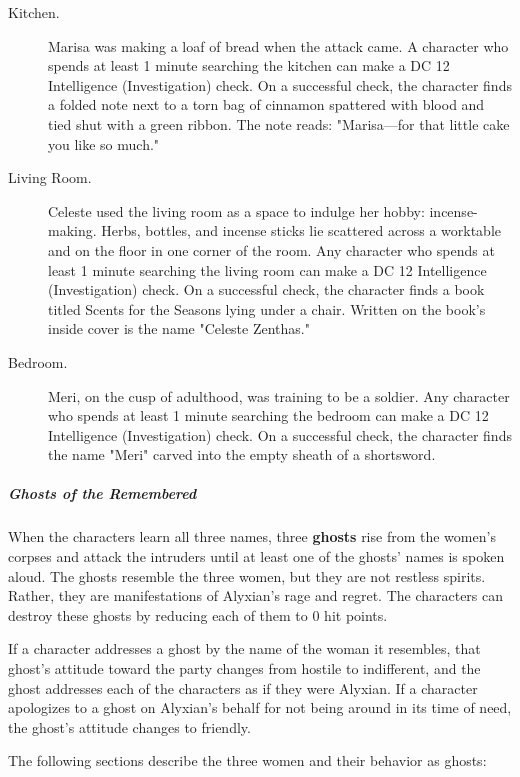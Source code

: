 \documentclass[10pt,a4paper,twoside,fancy,bg=print,twocolumn,openany,nodeprecatedcode]{dndbook}
\begin{document}
\begin{description}
\item[Kitchen.]
Marisa was making a loaf of bread when the attack came. A character who spends at least 1 minute searching the kitchen can make a DC 12 Intelligence (Investigation) check. On a successful check, the character finds a folded note next to a torn bag of cinnamon spattered with blood and tied shut with a green ribbon. The note reads: "Marisa—for that little cake you like so much."

\item[Living Room.]
Celeste used the living room as a space to indulge her hobby: incense-making. Herbs, bottles, and incense sticks lie scattered across a worktable and on the floor in one corner of the room. Any character who spends at least 1 minute searching the living room can make a DC 12 Intelligence (Investigation) check. On a successful check, the character finds a book titled Scents for the Seasons lying under a chair. Written on the book's inside cover is the name "Celeste Zenthas."

\item[Bedroom.]
Meri, on the cusp of adulthood, was training to be a soldier. Any character who spends at least 1 minute searching the bedroom can make a DC 12 Intelligence (Investigation) check. On a successful check, the character finds the name "Meri" carved into the empty sheath of a shortsword.
\end{description}

\subparagraph{Ghosts of the Remembered}
When the characters learn all three names, three \textbf{ghosts} rise from the women's corpses and attack the intruders until at least one of the ghosts' names is spoken aloud. The ghosts resemble the three women, but they are not restless spirits. Rather, they are manifestations of Alyxian's rage and regret. The characters can destroy these ghosts by reducing each of them to 0 hit points.

If a character addresses a ghost by the name of the woman it resembles, that ghost's attitude toward the party changes from hostile to indifferent, and the ghost addresses each of the characters as if they were Alyxian. If a character apologizes to a ghost on Alyxian's behalf for not being around in its time of need, the ghost's attitude changes to friendly.

The following sections describe the three women and their behavior as ghosts:
\end{document}
